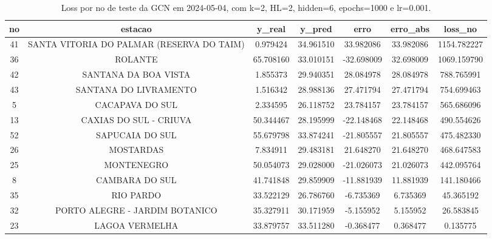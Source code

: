 \begin{table}[h]
\centering
\caption{Loss por no de teste da GCN em 2024-05-04, com k=2, HL=2, hidden=6, epochs=1000 e lr=0.001.}
\label{tab:gcn_loss_k2_hl2_h6_e1000_d20240504}
\begin{tabular}{ccccccc}
\toprule
no & estacao & y\_real & y\_pred & erro & erro\_abs & loss\_no \\
\midrule
41 & SANTA VITORIA DO PALMAR (RESERVA DO TAIM) & 0.979424 & 34.961510 & 33.982086 & 33.982086 & 1154.782227 \\
36 & ROLANTE & 65.708160 & 33.010151 & -32.698009 & 32.698009 & 1069.159790 \\
42 & SANTANA DA BOA VISTA & 1.855373 & 29.940351 & 28.084978 & 28.084978 & 788.765991 \\
43 & SANTANA DO LIVRAMENTO & 1.516342 & 28.988136 & 27.471794 & 27.471794 & 754.699463 \\
5 & CACAPAVA DO SUL & 2.334595 & 26.118752 & 23.784157 & 23.784157 & 565.686096 \\
13 & CAXIAS DO SUL - CRIUVA & 50.344467 & 28.195999 & -22.148468 & 22.148468 & 490.554626 \\
52 & SAPUCAIA DO SUL & 55.679798 & 33.874241 & -21.805557 & 21.805557 & 475.482330 \\
26 & MOSTARDAS & 7.834911 & 29.483181 & 21.648270 & 21.648270 & 468.647583 \\
25 & MONTENEGRO & 50.054073 & 29.028000 & -21.026073 & 21.026073 & 442.095764 \\
8 & CAMBARA DO SUL & 41.741848 & 29.859909 & -11.881939 & 11.881939 & 141.180466 \\
35 & RIO PARDO & 33.522129 & 26.786760 & -6.735369 & 6.735369 & 45.365192 \\
32 & PORTO ALEGRE - JARDIM BOTANICO & 35.327911 & 30.171959 & -5.155952 & 5.155952 & 26.583845 \\
23 & LAGOA VERMELHA & 33.879757 & 33.511280 & -0.368477 & 0.368477 & 0.135775 \\
\bottomrule
\end{tabular}
\end{table}
